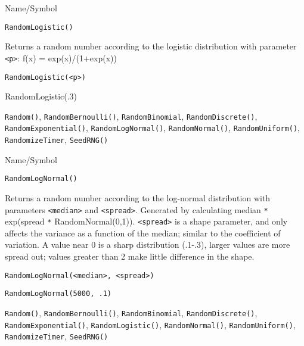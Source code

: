 \begin{desc}{Name/Symbol}
\item[Name/Symbol]	\verb+RandomLogistic()+  

\item[Description]	Returns a random number according to the logistic distribution 
		with parameter \verb+<p>+: f(x) = exp(x)/(1+exp(x))

\item[Usage]		
\begin{verbatim}
RandomLogistic(<p>)
\end{verbatim}

\item[Example]	RandomLogistic(.3)

\item[See Also]	\verb+Random()+, \verb+RandomBernoulli()+, \verb+RandomBinomial+, 
		\verb+RandomDiscrete()+, \verb+RandomExponential()+, \verb+RandomLogNormal()+, 
		\verb+RandomNormal()+, \verb+RandomUniform()+, \verb+RandomizeTimer+, \verb+SeedRNG()+
\end{desc}

\rl


\begin{desc}{Name/Symbol}
\item[Name/Symbol] 	\verb+RandomLogNormal()+

\item[Description]  	Returns a random number according to the log-normal 
		distribution with parameters \verb+<median>+ and \verb+<spread>+. Generated 
		by calculating median \verb!*! exp(spread \verb!*! RandomNormal(0,1)). 
		\verb+<spread>+ is a shape parameter, and only affects the variance 
		as a function of the median; similar to the coefficient of 
		variation.  A value near 0 is a sharp distribution (.1-.3), 
		larger values are more spread out; values greater than 2 make 
		little difference in the shape.

\item[Usage]
\begin{verbatim}
RandomLogNormal(<median>, <spread>)
\end{verbatim}

\item[Example]      	
\begin{verbatim}
RandomLogNormal(5000, .1)
\end{verbatim}

\item[See Also]	\verb+Random()+, \verb+RandomBernoulli()+, \verb+RandomBinomial+, 
		\verb+RandomDiscrete()+, \verb+RandomExponential()+, \verb+RandomLogistic()+,
		\verb+RandomNormal()+, \verb+RandomUniform()+, \verb+RandomizeTimer+, \verb+SeedRNG()+
\end{desc}

